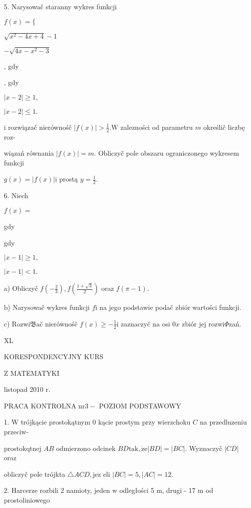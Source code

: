 \documentclass[a4paper,12pt]{article}
\begin{document}
5. Narysowač staranny wykres funkcji

$f(x)=\{$

$\sqrt{x^{2}-4x+4}-1$

$-\sqrt{4x-x^{2}-3}$

, gdy

, gdy

$|x-2|\geq 1,$

$|x-2|\leq 1.$

$\mathrm{i}$ rozwiązač nierównośč $|f(x)| > \displaystyle \frac{1}{2}. \mathrm{W}$ zalezności od parametru $m$ określič liczbę roz-

wiązań równania $|f(x)| =m$. Obliczyč pole obszaru ograniczonego wykresem funkcji

$g(x)=|f(x)|\mathrm{i}$ prostą $y=\displaystyle \frac{1}{2}.$

6. Niech

$f(x)=$

gdy

gdy

$|x-1|\geq 1,$

$|x-1|<1.$

a) Obliczyč $f(-\displaystyle \frac{2}{3}), f(\displaystyle \frac{1+\sqrt{3}}{2})$ oraz $f(\pi-1).$

b) Narysowač wykres funkcji $f\mathrm{i}$ na jego podstawie podač zbiór wartości funkcji.

c) Rozwi$\mathfrak{B}$ač nierównośč $f(x)\displaystyle \geq-\frac{1}{2}\mathrm{i}$ zaznaczyč na osi $0x$ zbiór jej rozwi$\Phi$zań.





XL

KORESPONDENCYJNY KURS

Z MATEMATYKI

listopad 2010 r.

PRACA KONTROLNA $\mathrm{n}\mathrm{r} 3-$ POZIOM PODSTAWOWY

1. $\mathrm{W}$ trójkącie prostokątnym $0$ kącie prostym przy wierzchoku $C$ na przedluzeniu przeciw-

prostokqtnej $AB$ odmierzono odcinek $BD\mathrm{t}\mathrm{a}\mathrm{k}, \dot{\mathrm{z}}\mathrm{e}|BD|=|BC|$. Wyznaczyč $|CD|$ oraz

obliczyč pole trójkta $\triangle ACD, \mathrm{j}\mathrm{e}\dot{\mathrm{z}}$ eli $|BC|=5, |AC|=12.$

2. Harcerze rozbili 2 namioty, jeden $\mathrm{w}$ odległości 5 $\mathrm{m}$, drugi - 17 $\mathrm{m}$ od prostoliniowego
\end{document}
